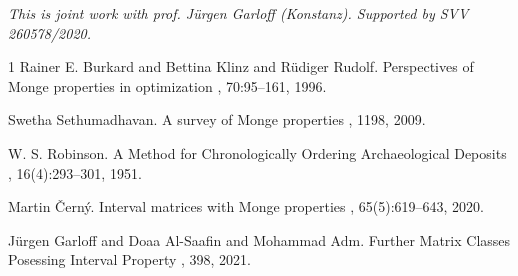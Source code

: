 \documentclass[a4paper]{amsart}
\begin{document}
\emph{This is joint work with prof. J\"{u}rgen Garloff (Konstanz).
Supported by SVV 260578/2020.}

\begin{thebibliography}{1}
Rainer E. Burkard and Bettina Klinz and R\"{u}diger Rudolf.
\newblock Perspectives of Monge properties in optimization
, 70:95--161, 1996.

Swetha Sethumadhavan.
\newblock A survey of Monge properties
, 1198, 2009.

W. S. Robinson.
\newblock A Method for Chronologically Ordering Archaeological Deposits
, 16(4):293--301, 1951.


Martin \v{C}ern\'{y}.
\newblock Interval matrices with Monge properties
, 65(5):619--643, 2020.

J\"{u}rgen Garloff and Doaa Al-Saafin and Mohammad Adm.
\newblock Further Matrix Classes Posessing Interval Property
, 398, 2021.


\end{thebibliography}
\end{document}
